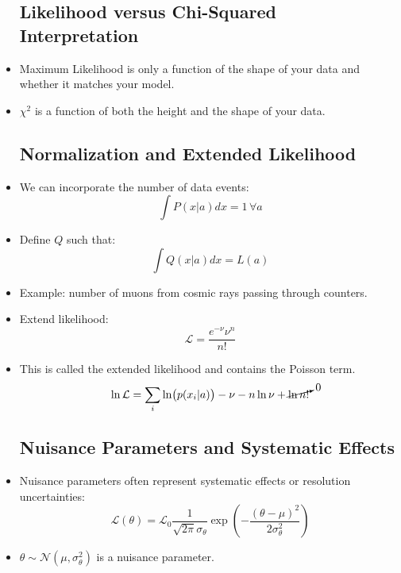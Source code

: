 \begin{itemize}
            \subsection{Likelihood versus Chi-Squared Interpretation}
      \item Maximum Likelihood is only a function of the shape of your data and whether it matches your model.
      \item $\chi^2$ is a function of both the height and the shape of your data.

            \subsection{Normalization and Extended Likelihood}
      \item We can incorporate the number of data events:
            \[
                  \int P(x|a) dx = 1 \, \forall a
            \]
      \item Define $Q$ such that:
            \[
                  \int Q(x|a) dx = L(a)
            \]
      \item Example: number of muons from cosmic rays passing through counters.
      \item Extend likelihood:
            \[
                  \mathcal{L} = \frac{e^{-\nu} \nu^n}{n!}
            \]
      \item This is called the extended likelihood and contains the Poisson term.
            \[
                  \ln{\mathcal{L}} = \sum_{i} \ln(p(x_i|a)) - \nu - n \ln \nu + \cancelto{0}{\ln n!}
            \]

            \subsection{Nuisance Parameters and Systematic Effects}
      \item Nuisance parameters often represent systematic effects or resolution uncertainties:
            \[
                  \mathcal{L}(\theta) = \mathcal{L}_{0} \frac{1}{\sqrt{2 \pi} \sigma_{\theta}} \exp \left( -\frac{(\theta - \mu)^2}{2 \sigma_{\theta}^2} \right)
            \]
      \item $\theta \sim \mathcal{N}(\mu, \sigma_{\theta}^2)$ is a nuisance parameter.


\end{itemize}

